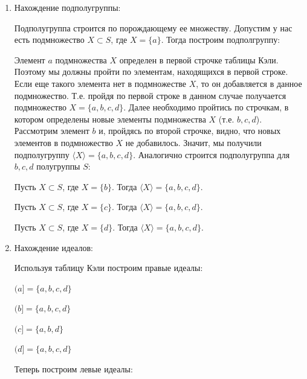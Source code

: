 \documentclass[bachelor, och, labwork]{shiza}
\begin{document}
    \begin{enumerate}
      \item Нахождение подполугруппы:
    
      Подполугруппа строится по порождающему ее множеству. Допустим у нас есть подмножество $X \subset S$, где $X = \{ a\}$. 
      Тогда построим подполгруппу:
  
      Элемент $a$ подмножества $X$ определен в первой строчке таблицы Кэли. Поэтому мы должны пройти по элементам, находящихся в первой
      строке. Если еще такого элемента нет в подмножестве $X$, то он добавляется в данное подмножество. Т.е. пройдя по первой строке в
      данном случае получается подмножество $X = \{a, b, c, d\}$. Далее необходимо пройтись по строчкам, в котором определены новые элементы
      подмножества $X$ (т.е. $b, c, d$). Рассмотрим элемент $b$ и, пройдясь по второй строчке, видно, что новых элементов в подмножество $X$
      не добавилось. Значит, мы получили подполугруппу $\langle X \rangle = \{a, b, c, d\}$.  
      Аналогично строится подполугруппа для $b,c,d$ полугруппы $S$:

      Пусть $X \subset S$, где $X = \{b\}$. Тогда $\langle X \rangle = \{a, b, c, d\}$.

      Пусть $X \subset S$, где $X = \{c\}$. Тогда $\langle X \rangle = \{a, b, c, d\}$.

      Пусть $X \subset S$, где $X = \{d\}$. Тогда $\langle X \rangle = \{a, b, c, d\}$.
      
      \item Нахождение идеалов:
      
      Используя таблицу Кэли построим правые идеалы:
      
      \begin{center}

        $(a] = \{a, b, c, d\}$

        $(b] = \{a, b, c, d\}$
  
        $(c] = \{a, b, d\}$
  
        $(d] = \{a, b, c, d\}$
    
      \end{center}
    
      
      Теперь построим левые идеалы:


\end{enumerate}
\end{document}
